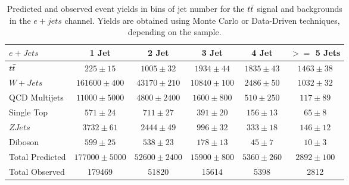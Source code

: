 \begin{table}
  \footnotesize
  \begin{tabular}{lccccc}
    \hline
    $e + Jets$ & 1 Jet & 2 Jet & 3 Jet & 4 Jet & $>=$ 5 Jets \\ 
    \hline
    $t\bar{t}$ & $225 \pm 15$ & $1005 \pm 32$ & $1934 \pm 44$ & $1835 \pm 43$ & $1463 \pm 38$ \\
    $W+Jets$ & $161600 \pm 400$ & $43170 \pm 210$ & $10840 \pm 100$ & $2486 \pm 50$ & $1032 \pm 32$ \\
    QCD Multijets & $11000 \pm 5000$ & $4800 \pm 2400$ & $1600 \pm 800$ & $510 \pm 250$ & $117 \pm 89$ \\
    Single Top & $571 \pm 24$ & $711 \pm 27$ & $391 \pm 20$ & $156 \pm 13$ & $65 \pm 8$ \\
    $ZJets$ & $3732 \pm 61$ & $2444 \pm 49$ & $996 \pm 32$ & $333 \pm 18$ & $146 \pm 12$ \\
    Diboson & $599 \pm 25$ & $538 \pm 23$ & $178 \pm 13$ & $45 \pm 7$ & $10 \pm 3$ \\
    \hline
    Total Predicted & $177000 \pm 5000$ & $52600 \pm 2400$ & $15900 \pm 800$ & $5360 \pm 260$ & $2892 \pm 100$ \\
    Total Observed & 179469 & 51820 & 15614 & 5398 & 2812 \\
    \hline
  \end{tabular}
  \caption{Predicted and observed event yields in bins of jet number for the $t\bar{t}$ signal and backgrounds in the $e+jets$ channel.  Yields are obtained using Monte Carlo or Data-Driven techniques, depending on the sample.}
\end{table}


